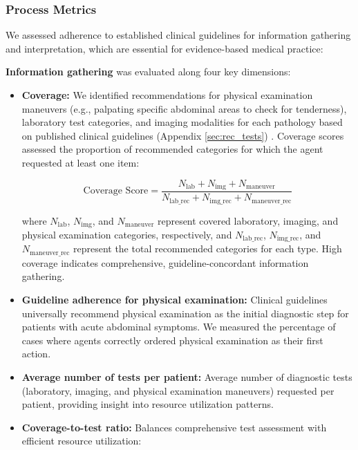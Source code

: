 \documentclass[manuscript, nonacm]{acmart}
\begin{document}
\subsubsection{\textbf{Process Metrics}}
We assessed adherence to established clinical guidelines for information gathering and interpretation, which are essential for evidence-based medical practice:

\textbf{Information gathering} was evaluated along four key dimensions:
\begin{itemize}
    \item \textbf{Coverage:} We identified recommendations for physical examination maneuvers (e.g., palpating specific abdominal areas to check for tenderness), laboratory test categories, and imaging modalities for each pathology based on published clinical guidelines (Appendix \ref{sec:rec_tests}) \cite{DiSaverio2020Appendicitis, Pisano2020Cholecystitis, Hall2020Diverticulitis, Leppaniemi2019Pancreatitis, yale2022appendicitis, salati2023cholecystitis, peery2022diverticulosis, tenner2013pancreatitis}. Coverage scores assessed the proportion of recommended categories for which the agent requested at least one item:

$$\text{Coverage Score} = \frac{N_{\text{lab}} + N_{\text{img}} + N_{\text{maneuver}}}{N_{\text{lab\_rec}} + N_{\text{img\_rec}} + N_{\text{maneuver\_rec}}}$$

where $N_{\text{lab}}$, $N_{\text{img}}$, and $N_{\text{maneuver}}$ represent covered laboratory, imaging, and physical examination categories, respectively, and $N_{\text{lab\_rec}}$, $N_{\text{img\_rec}}$, and $N_{\text{maneuver\_rec}}$ represent the total recommended categories for each type. High coverage indicates comprehensive, guideline-concordant information gathering.
    
    \item \textbf{Guideline adherence for physical examination:} Clinical guidelines universally recommend physical examination as the initial diagnostic step for patients with acute abdominal symptoms. We measured the percentage of cases where agents correctly ordered physical examination as their first action.
    
    \item \textbf{Average number of tests per patient:} Average number of diagnostic tests (laboratory, imaging, and physical examination maneuvers) requested per patient, providing insight into resource utilization patterns.
    
    \item \textbf{Coverage-to-test ratio:} Balances comprehensive test assessment with efficient resource utilization:


\end{itemize}
\end{document}
